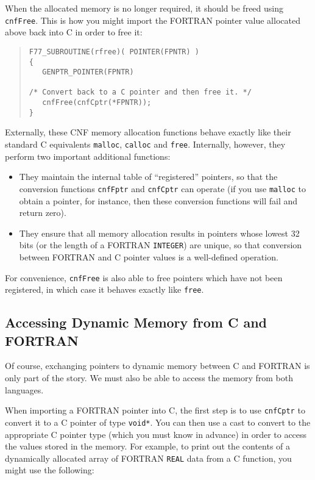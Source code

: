 \documentclass[twoside,11pt]{article}
\newcommand{\htmlref}[2]{#1}
\newcommand{\xlabel}[1]{}
\renewcommand{\_}{\texttt{\symbol{95}}}
\begin{document}
When the allocated memory is no longer required, it should be freed
using 
\htmlref{\texttt{cnfFree}}{cnfFree}. 
This is how you might import the FORTRAN
pointer value allocated above back into C in order to free it:

{\small \begin{quote} \begin{verbatim}
F77_SUBROUTINE(rfree)( POINTER(FPNTR) )
{
   GENPTR_POINTER(FPNTR)

/* Convert back to a C pointer and then free it. */
   cnfFree(cnfCptr(*FPNTR));
}
\end{verbatim} \end{quote} }

Externally, these CNF memory allocation functions behave exactly like
their standard C equivalents \texttt{malloc}, \texttt{calloc} and
\texttt{free}. Internally, however, they perform two important
additional functions:
\begin{itemize}

\item They maintain the internal table of ``registered'' pointers, so
that the conversion functions 
\htmlref{\texttt{cnfFptr}}{cnfFptr}
and
\htmlref{\texttt{cnfCptr}}{cnfCptr}
can operate (if you use \texttt{malloc} to obtain a
pointer, for instance, then these conversion functions will fail and
return zero).

\item They ensure that all memory allocation results in pointers whose
lowest 32 bits (or the length of a FORTRAN \texttt{INTEGER}) are
unique, so that conversion between FORTRAN and C pointer values is a
well-defined operation.
\end{itemize}

For convenience,
\htmlref{\texttt{cnfFree}}{cnfFree}
is also able to free pointers
which have not been registered, in which case it behaves exactly like
\texttt{free}.

\subsection{\xlabel{accessing_dynamic_memory_from_c_and_fortran}\label{percentval}Accessing
Dynamic Memory from C and FORTRAN}

Of course, exchanging pointers to dynamic memory between C and FORTRAN
is only part of the story. We must also be able to access the memory
from both languages.

When importing a FORTRAN pointer into C, the first step is to use
\htmlref{\texttt{cnfCptr}}{cnfCptr}
to convert it to a C pointer of type
\texttt{void*}. You can then use a cast to convert to the appropriate
C pointer type (which you must know in advance) in order to access the
values stored in the memory. For example, to print out the contents of
a dynamically allocated array of FORTRAN \texttt{REAL} data from a C
function, you might use the following:
\end{document}
